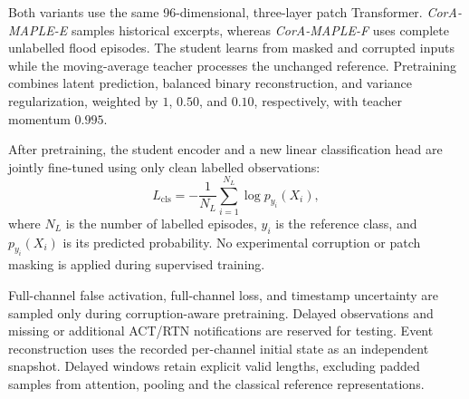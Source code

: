 Both variants use the same 96-dimensional, three-layer patch Transformer.
\emph{CorA-MAPLE-E} samples historical excerpts, whereas \emph{CorA-MAPLE-F}
uses complete unlabelled flood episodes. The student learns from masked and
corrupted inputs while the moving-average teacher processes the unchanged
reference. Pretraining combines latent prediction, balanced binary reconstruction,
and variance regularization, weighted by $1$, $0.50$, and $0.10$, respectively,
with teacher momentum $0.995$.

After pretraining, the student encoder and a new linear classification head are
jointly fine-tuned using only clean labelled observations:
\begin{equation}
L_{\mathrm{cls}}=-\frac{1}{N_L}\sum_{i=1}^{N_L}\log p_{y_i}(X_i),
\label{eq:clean_supervised}
\end{equation}
where $N_L$ is the number of labelled episodes, $y_i$ is the reference class, and
$p_{y_i}(X_i)$ is its predicted probability. No experimental corruption or patch
masking is applied during supervised training.

Full-channel false activation, full-channel loss, and timestamp uncertainty are
sampled only during corruption-aware pretraining. Delayed observations and missing
or additional ACT/RTN notifications are reserved for testing. Event reconstruction
uses the recorded per-channel initial state as an independent snapshot. Delayed
windows retain explicit valid lengths, excluding padded samples from attention,
pooling and the classical reference representations.
